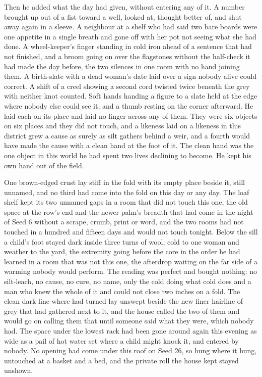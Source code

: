 Then he added what the day had given, without entering any of it. A number brought up out of a fist toward a well, looked at, thought better of, and shut away again in a sleeve. A neighbour at a shelf who had said two bare boards were one appetite in a single breath and gone off with her pot not seeing what she had done. A wheel-keeper's finger standing in cold iron ahead of a sentence that had not finished, and a broom going on over the flagstones without the half-check it had made the day before, the two silences in one room with no hand joining them. A birth-slate with a dead woman's date laid over a sign nobody alive could correct. A shift of a creel showing a second cord twisted twice beneath the grey with neither knot counted. Soft hands handing a figure to a slate held at the edge where nobody else could see it, and a thumb resting on the corner afterward. He laid each on its place and laid no finger across any of them. They were six objects on six places and they did not touch, and a likeness laid on a likeness in this district grew a cause as surely as silt gathers behind a weir, and a fourth would have made the cause with a clean hand at the foot of it. The clean hand was the one object in this world he had spent two lives declining to become. He kept his own hand out of the field.

One brown-edged crust lay stiff in the fold with its empty place beside it, still unnamed, and no third had come into the fold on this day or any day. The loaf shelf kept its two unnamed gaps in a room that did not touch this one, the old space at the row's end and the newer palm's breadth that had come in the night of Seed 6 without a scrape, crumb, print or word, and the two rooms had not touched in a hundred and fifteen days and would not touch tonight. Below the sill a child's foot stayed dark inside three turns of wool, cold to one woman and weather to the yard, the extremity going before the core in the order he had learned in a room that was not this one, the afterdrop waiting on the far side of a warming nobody would perform. The reading was perfect and bought nothing: no silt-leach, no cause, no cure, no name, only the cold doing what cold does and a man who knew the whole of it and could not close two inches on a fold. The clean dark line where  had turned lay unswept beside the new finer hairline of grey that had gathered next to it, and the house called the two of them  and would go on calling them that until someone said what they were, which nobody had. The space under the lowest rack had been gone around again this evening as wide as a pail of hot water set where a child might knock it, and entered by nobody. No opening had come under this roof on Seed 26, so  hung where it hung, untouched at a basket and a bed, and the private roll the house kept stayed unshown.

